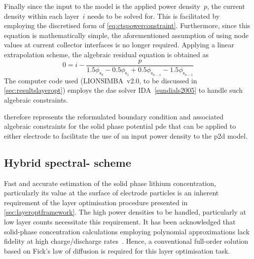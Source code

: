 Finally  since the  input to  the model  is the  applied power  density~$p$, the
current  density  within  each  layer~$i$  needs  to  be  solved  for.  This  is
facilitated by  employing the discretised form  of \cref{eq:ctspowerconstraint}.
Furthermore, since  this equation  is mathematically simple,  the aforementioned
assumption of  using node values  at current  collector interfaces is  no longer
required.  Applying  a  linear  extrapolation  scheme,  the  algebraic  residual
equation is obtained as
\begin{equation}\label{eq:currdensityresidual}
    0 = i - \frac{p}{1.5 \phi_{\mathrm{s}_0} - 0.5 \phi_{\mathrm{s}_1} + 0.5 \phi_{\mathrm{s}_{n-1}} - 1.5 \phi_{\mathrm{s}_{n-1}}}
\end{equation}
The    computer    code   used    (LIONSIMBA~v2.0,    to    be   discussed    in
\cref{sec:resultslayeropt}) employs the \gls{dae} solver IDA~\cref{sundials2005}
to handle such algebraic constraints.

 therefore represents the
reformulated  boundary condition  and associated  algebraic constraints  for the
solid  phase potential  \gls{pde} that  can be  applied to  either electrode  to
facilitate the use of an input power density to the \gls{p2d} model.

\subsection{Hybrid spectral- scheme}\label{sec:hybridfv-spectral}

Fast  and  accurate  estimation  of   the  solid  phase  lithium  concentration,
particularly  its   value  at   the  surface  of   electrode  particles   is  an
inherent  requirement   of  the   layer  optimisation  procedure   presented  in
\cref{sec:layeroptframework}.   The  high   power  densities   to  be   handled,
particularly  at  low   layer  counts  necessitate  this   requirement.  It  has
been   acknowledged  that   solid-phase  concentration   calculations  employing
polynomial    approximations   lack    fidelity    at   high    charge/discharge
rates~\cite{Santhanagopalan2006}.  Hence,  a  conventional  full-order  solution
based on Fick's law of diffusion is required for this layer optimisation task.

